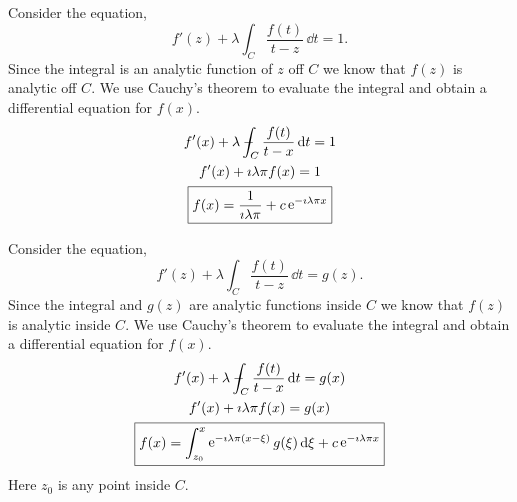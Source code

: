 \begin{Solution}
  Consider the equation,
  \[
  f'(z) + \lambda \int_C \frac{f(t)}{t-z}\,\dd t = 1.
  \]
  Since the integral is an analytic function of $z$ off $C$ we know that $f(z)$
  is analytic off $C$.  We use Cauchy's theorem to evaluate the integral 
  and obtain a differential equation for $f(x)$.
  \begin{gather*}
    f'(x) + \lambda - \negthickspace \negthickspace \negthickspace \negmedspace\int_C \frac{f(t)}{t-x}\,\mathrm{d} t = 1 \\
    f'(x) + \imath \lambda \pi f(x) = 1 \\
    \boxed{
      f(x) = \frac{1}{\imath \lambda \pi} + c \mathop{\mathrm{e}}\nolimits^{-\imath \lambda \pi x}
      }
  \end{gather*}


  Consider the equation,
  \[
  f'(z) + \lambda \int_C \frac{f(t)}{t-z}\,\dd t = g(z).
  \]
  Since the integral and $g(z)$ are analytic functions inside $C$ we know that 
  $f(z)$ is analytic inside $C$.  We use Cauchy's theorem to evaluate the 
  integral and obtain a differential equation for $f(x)$.
  \begin{gather*}
    f'(x) + \lambda - \negthickspace \negthickspace \negthickspace \negmedspace\int_C \frac{f(t)}{t-x}\,\mathrm{d} t = g(x) \\
    f'(x) + \imath \lambda \pi f(x) = g(x) \\
    \boxed{
      f(x) = \int_{z_0}^x \mathop{\mathrm{e}}\nolimits^{-\imath \lambda \pi (x-\xi)} g(\xi) \,\mathrm{d} \xi 
      + c \mathop{\mathrm{e}}\nolimits^{-\imath \lambda \pi x}
      }
  \end{gather*}
  Here $z_0$ is any point inside $C$.
\end{Solution}



